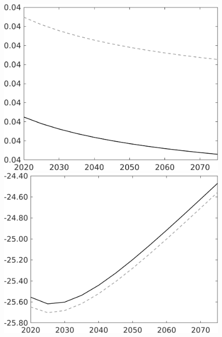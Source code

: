 \begin{figure}[h!!]
\begin{minipage}[]{0.32\textwidth}
\end{minipage}	
\begin{minipage}[]{0.32\textwidth}
\includegraphics[width=1\textwidth]{../../codding_model/own_basedOnFried/optimalPol_010922_revision/figures/all_13Sept22/PerdifNoTauf_regime0_CompTaul_hh_spillover0_nsk0_xgr0_sep1_LFlimit0_emsbase1_countec0_GovRev1_etaa0.79_lgd0.png}
\end{minipage}	
\begin{minipage}[]{0.32\textwidth}
\includegraphics[width=1\textwidth]{../../codding_model/own_basedOnFried/optimalPol_010922_revision/figures/all_13Sept22/PerdifNoTauf_regime0_CompTaul_sff_spillover0_nsk0_xgr0_sep1_LFlimit0_emsbase1_countec0_GovRev1_etaa0.79_lgd0.png}

\end{minipage}
\end{figure}

